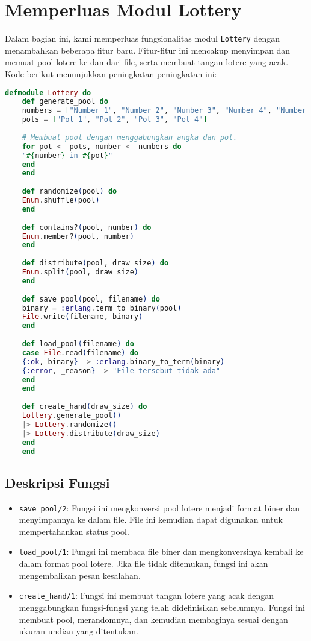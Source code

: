 \section{Memperluas Modul Lottery}

Dalam bagian ini, kami memperluas fungsionalitas modul \texttt{Lottery} dengan menambahkan beberapa fitur baru. Fitur-fitur ini mencakup menyimpan dan memuat pool lotere ke dan dari file, serta membuat tangan lotere yang acak. Kode berikut menunjukkan peningkatan-peningkatan ini:

\begin{lstlisting}[language=Elixir]
	defmodule Lottery do
	def generate_pool do
	numbers = ["Number 1", "Number 2", "Number 3", "Number 4", "Number 5"]
	pots = ["Pot 1", "Pot 2", "Pot 3", "Pot 4"]
	
	# Membuat pool dengan menggabungkan angka dan pot.
	for pot <- pots, number <- numbers do
	"#{number} in #{pot}"
	end
	end
	
	def randomize(pool) do
	Enum.shuffle(pool)
	end
	
	def contains?(pool, number) do
	Enum.member?(pool, number)
	end
	
	def distribute(pool, draw_size) do
	Enum.split(pool, draw_size)
	end
	
	def save_pool(pool, filename) do
	binary = :erlang.term_to_binary(pool)
	File.write(filename, binary)
	end
	
	def load_pool(filename) do
	case File.read(filename) do
	{:ok, binary} -> :erlang.binary_to_term(binary)
	{:error, _reason} -> "File tersebut tidak ada"
	end
	end
	
	def create_hand(draw_size) do
	Lottery.generate_pool()
	|> Lottery.randomize()
	|> Lottery.distribute(draw_size)
	end
	end
\end{lstlisting}

\subsection{Deskripsi Fungsi}

\begin{itemize}
	\item \texttt{save\_pool/2}: Fungsi ini mengkonversi pool lotere menjadi format biner dan menyimpannya ke dalam file. File ini kemudian dapat digunakan untuk mempertahankan status pool.
	\item \texttt{load\_pool/1}: Fungsi ini membaca file biner dan mengkonversinya kembali ke dalam format pool lotere. Jika file tidak ditemukan, fungsi ini akan mengembalikan pesan kesalahan.
	\item \texttt{create\_hand/1}: Fungsi ini membuat tangan lotere yang acak dengan menggabungkan fungsi-fungsi yang telah didefinisikan sebelumnya. Fungsi ini membuat pool, merandomnya, dan kemudian membaginya sesuai dengan ukuran undian yang ditentukan.
\end{itemize}

